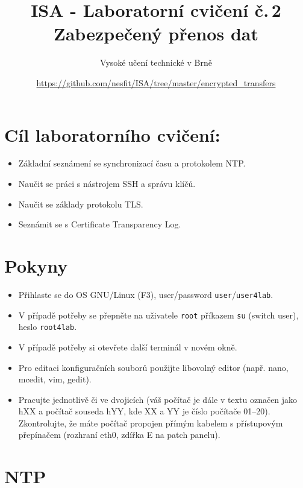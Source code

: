 \documentclass[a4paper,11pt]{article}
\title{ISA - Laboratorní cvičení č.\,2\\
{\bf\large Zabezpečený přenos dat}}
\author{Vysoké učení technické v Brně}
\date{\url{https://github.com/nesfit/ISA/tree/master/encrypted_transfers}}
\begin{document}
{\let\newpage\relax\maketitle}

\section*{Cíl laboratorního cvičení:}
\begin{itemize}
  \item Základní seznámení se synchronizací času a protokolem NTP.
  \item Naučit se práci s nástrojem SSH a správu klíčů.
  \item Naučit se základy protokolu TLS.
  \item Seznámit se s Certificate Transparency Log.
\end{itemize}

\section*{Pokyny}
\begin{itemize}
  \item Přihlaste se do OS GNU/Linux (F3), user/password {\tt user}/{\tt user4lab}.
  \item V případě potřeby se přepněte na uživatele {\tt root} příkazem {\tt su}
  (switch user), heslo {\tt root4lab}.
  \item V případě potřeby si otevřete další terminál v novém okně.
  \item Pro editaci konfiguračních souborů použijte libovolný editor (např.
  nano, mcedit, vim, gedit).
\item Pracujte jednotlivě či ve dvojicích (váš počítač je dále v textu označen jako hXX a
  počítač souseda hYY, kde XX a YY je číslo počítače 01--20). Zkontrolujte, že máte počítač propojen
    přímým kabelem s přístupovým přepínačem (rozhraní eth0, zdířka E na patch
    panelu).
  
\end{itemize}

\section{NTP}
\end{document}
